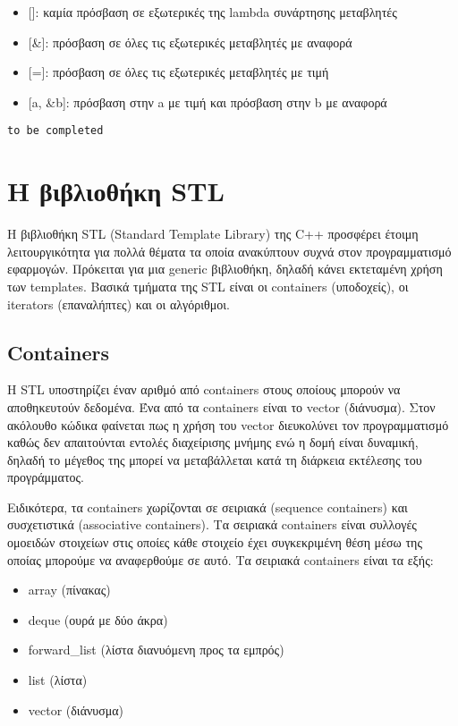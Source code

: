 \begin{itemize}[noitemsep]
\item {[]}: καμία πρόσβαση σε εξωτερικές της lambda συνάρτησης μεταβλητές
\item {[\&]}: πρόσβαση σε όλες τις εξωτερικές μεταβλητές με αναφορά
\item {[=]}: πρόσβαση σε όλες τις εξωτερικές μεταβλητές με τιμή
\item {[a, \&b]}: πρόσβαση στην a με τιμή και πρόσβαση στην b με αναφορά
\end{itemize}

\begin{lstlisting}[style=DOS]
to be completed
\end{lstlisting}

\section{Η βιβλιοθήκη STL}
Η βιβλιοθήκη STL (Standard Template Library) της C++ προσφέρει έτοιμη λειτουργικότητα για πολλά θέματα τα οποία ανακύπτουν συχνά στον προγραμματισμό εφαρμογών. Πρόκειται για μια generic βιβλιοθήκη, δηλαδή κάνει εκτεταμένη χρήση των templates. Βασικά τμήματα της STL είναι οι containers (υποδοχείς), οι iterators (επαναλήπτες) και οι αλγόριθμοι.

\subsection{Containers}
H STL υποστηρίζει έναν αριθμό από containers στους οποίους μπορούν να αποθηκευτούν δεδομένα. Ένα από τα containers είναι το vector (διάνυσμα). Στον ακόλουθο κώδικα φαίνεται πως η χρήση του vector διευκολύνει τον προγραμματισμό καθώς δεν απαιτούνται εντολές διαχείρισης μνήμης ενώ η δομή είναι δυναμική, δηλαδή το μέγεθος της μπορεί να μεταβάλλεται κατά τη διάρκεια εκτέλεσης του προγράμματος. 





Ειδικότερα, τα containers χωρίζονται σε σειριακά (sequence containers) και συσχετιστικά (associative containers). Τα σειριακά containers είναι συλλογές ομοειδών στοιχείων στις οποίες κάθε στοιχείο  έχει συγκεκριμένη θέση μέσω της οποίας μπορούμε να αναφερθούμε σε αυτό. Τα σειριακά containers είναι τα εξής: 
\begin{itemize}[noitemsep]
\item array (πίνακας) 
\item deque (ουρά με δύο άκρα)
\item forward\_list (λίστα διανυόμενη προς τα εμπρός)
\item list (λίστα)
\item vector (διάνυσμα)
\end{itemize}


